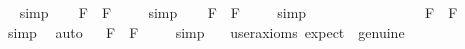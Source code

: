 \begin{isabellebody}
\isadelimproof
\ %
\endisadelimproof
%
\isatagproof
{}\isamarkupfalse%
\ simp\ \isamarkupfalse%
%
\endisatagproof
{\isafoldproof}%
%
\isadelimproof
%
\endisadelimproof
\isanewline
\ \isamarkupfalse%
\ {\isachardoublequoteopen}{\isacharbrackleft}\isactrlbold {\isasymdiamond}{\isasymphi}\isactrlsup F\ \isactrlbold {\isasymrightarrow}\ \isactrlbold {\isasymbox}\isactrlbold {\isasymdiamond}{\isasymphi}\isactrlsup F{\isacharbrackright}\ {\isacharequal}\ {\isasymtop}{\isachardoublequoteclose}%
\isadelimproof
\ %
\endisadelimproof
%
\isatagproof
{}\isamarkupfalse%
\ simp\ \isamarkupfalse%
%
\endisatagproof
{\isafoldproof}%
%
\isadelimproof
%
\endisadelimproof
\isanewline
\ \isamarkupfalse%
\ {\isachardoublequoteopen}{\isacharbrackleft}\isactrlbold {\isasymbox}\isactrlbold {\isasymdiamond}{\isasymphi}\isactrlsup F\ \isactrlbold {\isasymrightarrow}\ \isactrlbold {\isasymdiamond}{\isasymphi}\isactrlsup F{\isacharbrackright}\ {\isacharequal}\ {\isasymtop}{\isachardoublequoteclose}%
\isadelimproof
\ %
\endisadelimproof
%
\isatagproof
{}\isamarkupfalse%
\ simp\ \isamarkupfalse%
\ \ \ \ \ \ \ \ \ \ \ \ %
%
\endisatagproof
{\isafoldproof}%
%
\isadelimproof
%
\endisadelimproof
\isanewline
\ \isamarkupfalse%
\ {\isachardoublequoteopen}{\isacharbrackleft}\isactrlbold {\isasymdiamond}\isactrlbold {\isasymbox}{\isasymphi}\isactrlsup F\ \isactrlbold {\isasymrightarrow}\ \isactrlbold {\isasymdiamond}{\isasymphi}\isactrlsup F{\isacharbrackright}\ {\isacharequal}\ {\isasymtop}{\isachardoublequoteclose}%
\isadelimproof
\ %
\endisadelimproof
%
\isatagproof
{}\isamarkupfalse%
\ simp\ \isamarkupfalse%
\ auto%
\endisatagproof
{\isafoldproof}%
%
\isadelimproof
%
\endisadelimproof
\isanewline
\ \isamarkupfalse%
\ {\isachardoublequoteopen}{\isacharbrackleft}\isactrlbold {\isasymbox}\isactrlbold {\isasymdiamond}{\isasymphi}\isactrlsup F\ \isactrlbold {\isasymrightarrow}\ \isactrlbold {\isasymbox}{\isasymphi}\isactrlsup F{\isacharbrackright}\ {\isacharequal}\ {\isasymtop}{\isachardoublequoteclose}%
\isadelimproof
\ %
\endisadelimproof
%
\isatagproof
{}\isamarkupfalse%
\ simp\ \isamarkupfalse%
\ \ {\isacharbrackleft}user{\isacharunderscore}axioms{\isacharcomma}\ expect\ {\isacharequal}\ genuine{\isacharbrackright}\ \isamarkupfalse%
\ \ \ %
%
\endisatagproof
{\isafoldproof}%

\end{isabellebody}
